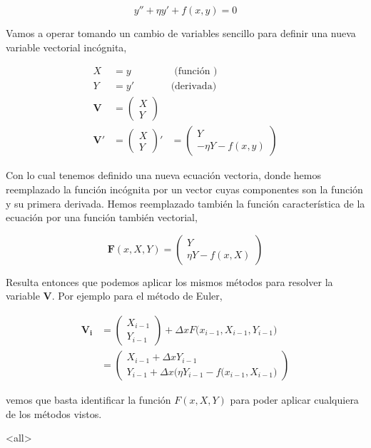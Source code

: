 \begin{equation}
 y'' + \eta y' + f(x, y) = 0
\end{equation}

Vamos a operar tomando un cambio de variables sencillo para definir una nueva variable vectorial 
incógnita, 

\begin{equation}
  \begin{aligned}
    X &= y &\text{ (función ) } \\
    Y &= y' &\text{(derivada) }\\
    \mathbf{V} &= \begin{pmatrix} X \\ Y  \end{pmatrix} \\
      \mathbf{V'} &=  \begin{pmatrix} X \\ Y  \end{pmatrix}' &= 
	\begin{pmatrix}   Y \\	  -\eta Y - f(x, y)  \end{pmatrix}
  \end{aligned}
\end{equation}

Con lo cual tenemos definido una nueva ecuación vectoria, donde hemos reemplazado 
la función incógnita por un vector cuyas componentes son la función y su primera 
derivada. Hemos reemplazado también la función característica de la ecuación por una
función también vectorial, 

\begin{equation}
  \mathbf{F}(x, X, Y) = \begin{pmatrix} Y\\ \eta Y - f(x, X)   \end{pmatrix}
\end{equation}

Resulta entonces que podemos aplicar los mismos métodos para resolver la variable
$\mathbf{V}$. Por ejemplo para el método de Euler, 

\begin{equation}\label{EqnEulerVec}
  \begin{aligned}
    \mathbf{V_i} &= \begin{pmatrix} X_{i-1} \\ Y_{i-1} \end{pmatrix} + 
      \Delta x F\Big( x_{i-1}, X_{i-1}, Y_{i-1} \Big) \\
      {} &= 
      \begin{pmatrix} 
	X_{i-1} + \Delta x Y_{i-1} \\ 
	Y_{i-1} + \Delta x \Big( \eta Y_{i-1} - f(x_{i-1} , X_{i-1}\Big)
      \end{pmatrix}
  \end{aligned}
\end{equation}

vemos que basta identificar la función $F(x, X, Y)$ para poder aplicar cualquiera de los métodos vistos.

\mode*

\mode<all>
